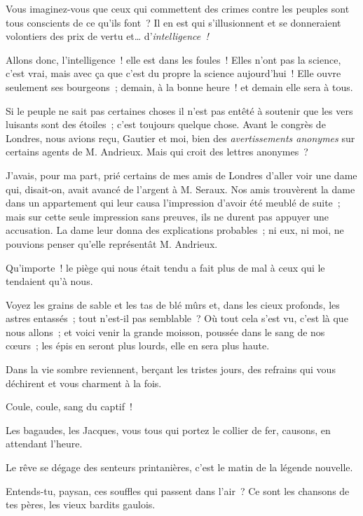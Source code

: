 \documentclass[french,twoside]{book} %
\newenvironment{quoteblock}%
  {\begin{quoting}}
  {\end{quoting}}
\newenvironment{quotebar}{%
    \def\FrameCommand{{\color{rubric!10!}\vrule width 0.5em} \hspace{0.9em}}%
    \def\OuterFrameSep{\itemsep} %
    \MakeFramed {\advance\hsize-\width \FrameRestore}
  }%
  {%
    \endMakeFramed
  }
\renewenvironment{quoteblock}%
  {%
    \savenotes
    \setstretch{0.9}
    \normalfont
    \begin{quotebar}
  }
  {%
    \end{quotebar}
    \spewnotes
  }
\begin{document}
Vous imaginez-vous que ceux qui commettent des crimes contre les peuples sont tous conscients de ce qu’ils font ? Il en est qui s’illusionnent et se donneraient volontiers des prix de vertu et… d’\emph{intelligence !}\par
Allons donc, l’intelligence ! elle est dans les foules ! Elles n’ont pas la science, c’est vrai, mais avec ça que c’est du propre la science aujourd’hui ! Elle ouvre seulement ses bourgeons ; demain, à la bonne heure ! et demain elle sera à tous.\par
Si le peuple ne sait pas certaines choses il n’est pas entêté à soutenir que les vers luisants sont des étoiles ; c’est toujours quelque chose. Avant le congrès de Londres, nous avions reçu, Gautier et moi, bien des \emph{avertissements anonymes} sur certains agents de M. Andrieux. Mais qui croit des lettres anonymes ?\par
J’avais, pour ma part, prié certains de mes amis de Londres d’aller voir une dame qui, disait-on, avait avancé de l’argent à M. Seraux.  Nos amis trouvèrent la dame dans un appartement qui leur causa l’impression d’avoir été meublé de suite ; mais sur cette seule impression sans preuves, ils ne durent pas appuyer une accusation. La dame leur donna des explications probables ; ni eux, ni moi, ne pouvions penser qu’elle représentât M. Andrieux.\par
Qu’importe ! le piège qui nous était tendu a fait plus de mal à ceux qui le tendaient qu’à nous.\par
Voyez les grains de sable et les tas de blé mûrs et, dans les cieux profonds, les astres entassés ; tout n’est-il pas semblable ? Où tout cela s’est vu, c’est là que nous allons ; et voici venir la grande moisson, poussée dans le sang de nos cœurs ; les épis en seront plus lourds, elle en sera plus haute.\par
Dans la vie sombre reviennent, berçant les tristes jours, des refrains qui vous déchirent et vous charment à la fois.\par

\begin{quoteblock}
 \noindent Coule, coule, sang du captif !
 \end{quoteblock}

\noindent Les bagaudes, les Jacques, vous tous qui portez le collier de fer, causons, en attendant l’heure.\par
Le rêve se dégage des senteurs printanières, c’est le matin de la légende nouvelle.\par
Entends-tu, paysan, ces souffles qui passent  dans l’air ? Ce sont les chansons de tes pères, les vieux bardits gaulois.\par
\end{document}
